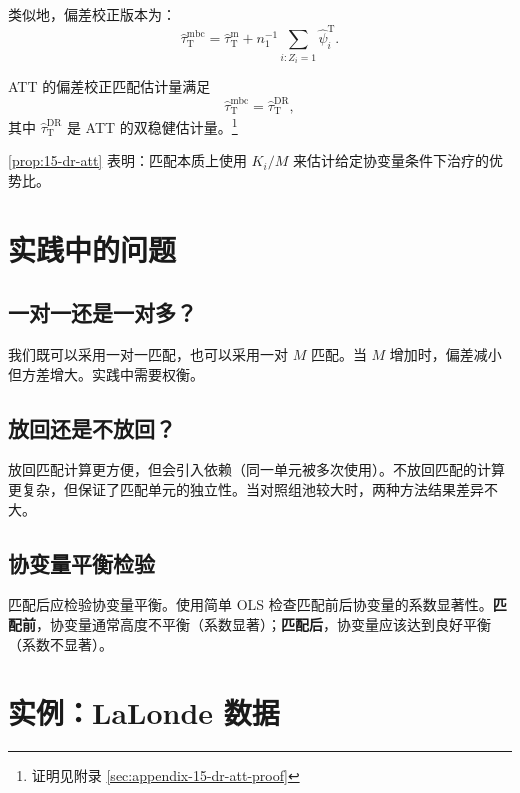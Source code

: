 类似地，偏差校正版本为：
\[
\hat\tau_{\mathrm{T}}^{\mathrm{mbc}} = \hat\tau_{\mathrm{T}}^{\mathrm{m}} + n_1^{-1} \sum_{i: Z_i=1} \hat\psi_i^{\mathrm{T}} .
\label{eq:15-bias-corrected-att}
\]

\begin{Proposition}\label{prop:15-dr-att}
ATT 的偏差校正匹配估计量满足
\[
\hat\tau_{\mathrm{T}}^{\mathrm{mbc}} = \hat\tau_{\mathrm{T}}^{\mathrm{DR}},
\]
其中 $\hat\tau_{\mathrm{T}}^{\mathrm{DR}}$ 是 ATT 的双稳健估计量。\footnote{证明见附录 \cref{sec:appendix-15-dr-att-proof}}
\end{Proposition}

\cref{prop:15-dr-att} 表明：匹配本质上使用 $K_i / M$ 来估计给定协变量条件下治疗的优势比。

\section{实践中的问题}\label{sec:15-practice}

\subsection{一对一还是一对多？}\label{sec:15-one-to-many}

我们既可以采用一对一匹配，也可以采用一对 $M$ 匹配。当 $M$ 增加时，偏差减小但方差增大。实践中需要权衡。

\subsection{放回还是不放回？}\label{sec:15-replacement}

放回匹配计算更方便，但会引入依赖（同一单元被多次使用）。不放回匹配的计算更复杂，但保证了匹配单元的独立性。当对照组池较大时，两种方法结果差异不大。

\subsection{协变量平衡检验}\label{sec:15-balance-check}

匹配后应检验协变量平衡。使用简单 OLS 检查匹配前后协变量的系数显著性。\textbf{匹配前}，协变量通常高度不平衡（系数显著）；\textbf{匹配后}，协变量应该达到良好平衡（系数不显著）。

\section{实例：LaLonde 数据}\label{sec:15-lalonde}

